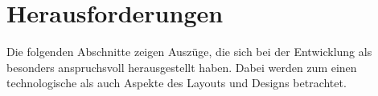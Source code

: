 \section{Herausforderungen}

Die folgenden Abschnitte zeigen Auszüge, die sich bei der Entwicklung
als besonders anspruchsvoll herausgestellt haben.
Dabei werden zum einen technologische als auch Aspekte
des Layouts und Designs betrachtet.




